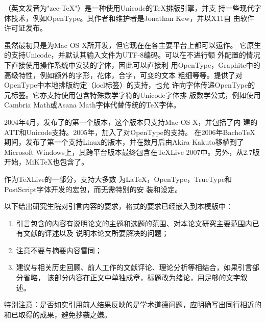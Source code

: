 \XeTeX{}（英文发音为"zee-\TeX{}"）是一种使用Unicode的\TeX{}排版引擎，并支
持一些现代字体技术，例如OpenType。其作者和维护者是Jonathan Kew，并以X11自
由软件许可证发布。

虽然\XeTeX{}最初只是为Mac OS X所开发，但它现在在各主要平台上都可以运作。
它原生的支持Unicode，并默认其输入文件为UTF-8编码。\XeTeX{}可以在不进行额
外配置的情况下直接使用操作系统中安装的字体，因此可以直接利
用OpenType，Graphite中的高级特性，例如额外的字形，花体，合字，可变的文本
粗细等等。\XeTeX{}提供了对OpenType中本地排版约定（locl标签）的支持，也允
许向字体传递OpenType的元标签。它亦支持使用包含特殊数学字符的Unicode字体排
版数学公式，例如使用Cambria Math或Asana Math字体代替传统的\TeX{}字体。


2004年4月，发布了\XeTeX{}的第一个版本，这个版本只支持Mac OS X，并包括了内
建的ATT和Unicode支持。2005年，加入了对OpenType的支持。
在2006年Bacho\TeX{}期间，发布了第一个支持Linux的版本，并在数月后由Akira
Kakuto移植到了Microsoft Windows上，其跨平台版本最终包含在\TeX{}Live
2007中。另外，从2.7版开始，MiK\TeX{}也包含了\XeTeX{}。

作为\TeX{}Live的一部分，\XeTeX{}支持大多数
为\LaTeX{}，OpenType，TrueType和PostScript字体开发的宏包，而无需特别的安
装和设定。


以下给出研究生院对引言内容的要求，格式的要求已经嵌入到本模版中：
\begin{enumerate}
\item 引言包含的内容有说明论文的主题和选题的范围、对本论文研究主要范围内已有文献的评述以及
  说明本论文所要解决的问题；
\item 注意不要与摘要内容雷同；
\item 建议与相关历史回顾、前人工作的文献评论、理论分析等相结合，如果引言部分省略，
  该部分内容在正文中单独成章，标题改为绪论，用足够的文字叙述。
\end{enumerate}

\textcolor[rgb]{1.00,0.00,0.00}
{特别注意：是否如实引用前人结果反映的是学术道德问题，应明确写出同行相近的和已取得的成果，避免抄袭之嫌。}
